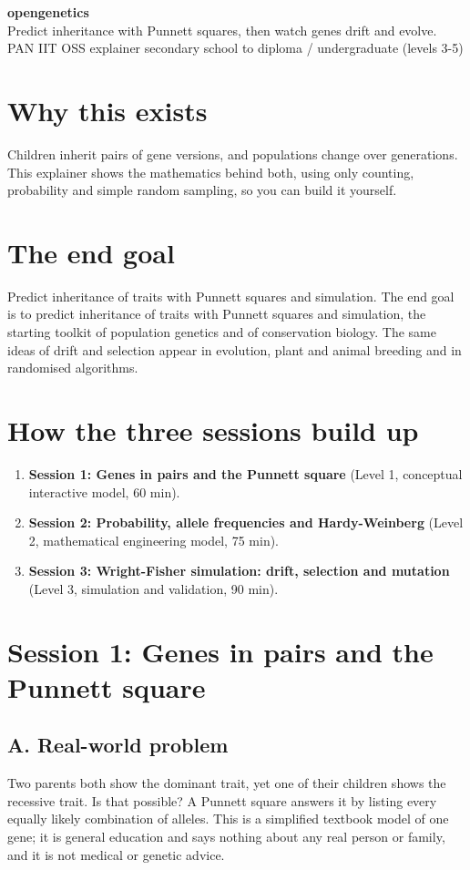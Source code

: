 \documentclass[11pt,a4paper]{article}
\begin{document}
\begin{center}{\LARGE\bfseries opengenetics}\\[0.4em]{\large Predict inheritance with Punnett squares, then watch genes drift and evolve.}\\[0.2em]\small PAN IIT OSS explainer \textbullet{} secondary school to diploma / undergraduate (levels 3-5)\end{center}

\section*{Why this exists}
Children inherit pairs of gene versions, and populations change over generations. This explainer shows the mathematics behind both, using only counting, probability and simple random sampling, so you can build it yourself.

\section*{The end goal}
Predict inheritance of traits with Punnett squares and simulation. The end goal is to predict inheritance of traits with Punnett squares and simulation, the starting toolkit of population genetics and of conservation biology. The same ideas of drift and selection appear in evolution, plant and animal breeding and in randomised algorithms.

\section*{How the three sessions build up}
\begin{enumerate}[nosep]
\item \textbf{Session 1: Genes in pairs and the Punnett square} (Level 1, conceptual interactive model, 60 min).
\item \textbf{Session 2: Probability, allele frequencies and Hardy-Weinberg} (Level 2, mathematical engineering model, 75 min).
\item \textbf{Session 3: Wright-Fisher simulation: drift, selection and mutation} (Level 3, simulation and validation, 90 min).
\end{enumerate}

\section{Session 1: Genes in pairs and the Punnett square}

\subsection*{A. Real-world problem}
Two parents both show the dominant trait, yet one of their children shows the recessive trait. Is that possible? A Punnett square answers it by listing every equally likely combination of alleles. This is a simplified textbook model of one gene; it is general education and says nothing about any real person or family, and it is not medical or genetic advice.
\end{document}
